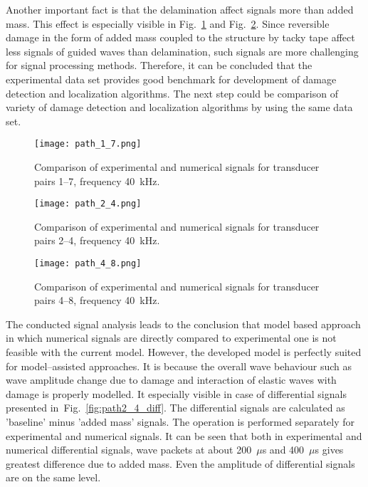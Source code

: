\documentclass[preprint,12pt]{elsarticle}
\begin{document}
	Another important fact is that the delamination affect signals more than added mass. This effect is especially visible in Fig.~\ref{fig:path1_7} and Fig.~\ref{fig:path2_4}. Since reversible damage in the form of added mass coupled to the structure by tacky tape affect less signals of guided waves than delamination, such signals are more challenging for signal processing methods. Therefore, it can be concluded that the experimental data set provides good benchmark for development of damage detection and localization algorithms. The next step could be comparison of variety of damage detection and localization algorithms by using the same data set.
	
	\begin{figure} [h!]
		\centering
		\texttt{[image: path\_1\_7.png]}	
		\caption{Comparison of experimental and numerical signals for transducer pairs 1--7, frequency 40~kHz.}
		\label{fig:path1_7}
	\end{figure}
	\begin{figure} [h!]
		\centering
		\texttt{[image: path\_2\_4.png]}	
		\caption{Comparison of experimental and numerical signals for transducer pairs 2--4, frequency 40~kHz.}
		\label{fig:path2_4}
	\end{figure}
	\begin{figure} [h!]
		\centering
		\texttt{[image: path\_4\_8.png]}	
		\caption{Comparison of experimental and numerical signals for transducer pairs 4--8, frequency 40~kHz.}
		\label{fig:path4_8}
	\end{figure}
	\clearpage
	The conducted signal analysis leads to the conclusion that model based approach in which numerical signals are directly compared to experimental one is not feasible with the current model. However, the developed model is perfectly suited for model--assisted approaches. It is because the overall wave behaviour such as wave amplitude change due to damage and interaction of elastic waves with damage is properly modelled. It especially visible in case of differential signals presented in~Fig.~\ref{fig:path2_4_diff}. The differential signals are calculated as 'baseline' minus 'added mass' signals. The operation is performed separately for experimental and numerical signals. It can be seen that both in experimental and numerical differential signals, wave packets at about 200~$\mu$s and 400~$\mu$s gives greatest difference due to added mass. Even the amplitude of differential signals are on the same level.
	
\end{document}
